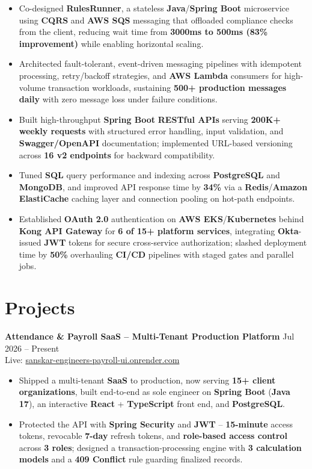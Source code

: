 \documentclass[a4paper,10pt]{article}
\begin{document}
\begin{itemize}[leftmargin=*]
    \item Co-designed \textbf{RulesRunner}, a stateless \textbf{Java}/\textbf{Spring Boot} microservice using \textbf{CQRS} and \textbf{AWS SQS} messaging that offloaded compliance checks from the client, reducing wait time from \textbf{3000ms to 500ms (83\% improvement)} while enabling horizontal scaling.
    \item Architected fault-tolerant, event-driven messaging pipelines with idempotent processing, retry/backoff strategies, and \textbf{AWS Lambda} consumers for high-volume transaction workloads, sustaining \textbf{500+ production messages daily} with zero message loss under failure conditions.
    \item Built high-throughput \textbf{Spring Boot} \textbf{RESTful APIs} serving \textbf{200K+ weekly requests} with structured error handling, input validation, and \textbf{Swagger/OpenAPI} documentation; implemented URL-based versioning across \textbf{16 v2 endpoints} for backward compatibility.
    \item Tuned \textbf{SQL} query performance and indexing across \textbf{PostgreSQL} and \textbf{MongoDB}, and improved API response time by \textbf{34\%} via a \textbf{Redis}/\textbf{Amazon ElastiCache} caching layer and connection pooling on hot-path endpoints.
    \item Established \textbf{OAuth 2.0} authentication on \textbf{AWS EKS}/\textbf{Kubernetes} behind \textbf{Kong API Gateway} for \textbf{6 of 15+ platform services}, integrating \textbf{Okta}-issued \textbf{JWT} tokens for secure cross-service authorization; slashed deployment time by \textbf{50\%} overhauling \textbf{CI/CD} pipelines with staged gates and parallel jobs.
\end{itemize}

\section*{Projects}

\textbf{Attendance \& Payroll SaaS -- Multi-Tenant Production Platform} \hfill Jul 2026 -- Present \\
Live: \href{https://sanskar-engineers-payroll-ui.onrender.com/login}{sanskar-engineers-payroll-ui.onrender.com}
\begin{itemize}[leftmargin=*]
    \item Shipped a multi-tenant \textbf{SaaS} to production, now serving \textbf{15+ client organizations}, built end-to-end as sole engineer on \textbf{Spring Boot} (\textbf{Java 17}), an interactive \textbf{React} + \textbf{TypeScript} front end, and \textbf{PostgreSQL}.
    \item Protected the API with \textbf{Spring Security} and \textbf{JWT} -- \textbf{15-minute} access tokens, revocable \textbf{7-day} refresh tokens, and \textbf{role-based access control} across \textbf{3 roles}; designed a transaction-processing engine with \textbf{3 calculation models} and a \textbf{409 Conflict} rule guarding finalized records.
\end{itemize}
\end{document}
